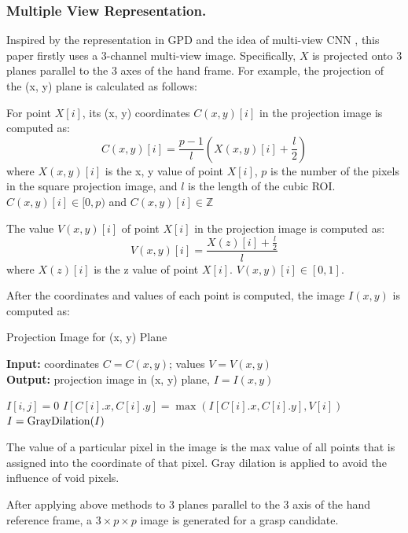 \documentclass[letterpaper]{article} %
\begin{document}
\subsubsection{Multiple View Representation.}
Inspired by the representation in GPD \cite{RN6} and the idea of multi-view CNN \cite{RN7}, this paper firstly uses a 3-channel multi-view image. Specifically, $X$ is projected onto 3 planes parallel to the 3 axes of the hand frame. For example, the projection of the (x, y) plane is calculated as follows:

For point $X[i]$, its (x, y) coordinates $C(x, y)[i]$ in the projection image is computed as:
\begin{equation}
    C(x, y)[i]=\frac{p-1}{l} (X(x, y)[i] + \frac {l} 2)
\end{equation}
where $X(x, y)[i]$ is the x, y value of point $X[i]$, $p$ is the number of the pixels in the square projection image, and $l$ is the length of the cubic ROI. $C(x, y)[i]\in [0, p)$ and $C(x, y)[i]\in \mathbb{Z}$

The value $V(x, y)[i]$ of point $X[i]$ in the projection image is computed as:
\begin{equation}
    V(x, y)[i]=\frac{X(z)[i]+\frac{l}{2}}{l}
\end{equation}
where $X(z)[i]$ is the z value of point $X[i]$. $V(x, y)[i]\in [0, 1]$. 

After the coordinates and values of each point is computed, the image $I(x, y)$ is computed as:

\begin{algorithm}[H]
\caption{Projection Image for (x, y) Plane}
\textbf{Input:} coordinates $C=C(x, y)$; values $V=V(x, y)$\\
\textbf{Output:} projection image in (x, y) plane, $I=I(x,y)$ \\
\begin{algorithmic}[1]
\STATE $I[i, j] = 0$
\ENDFOR
\ENDFOR
{}
\STATE $I[C[i].x, C[i].y]=\max(I[C[i].x, C[i].y], V[i])$
\ENDFOR
\STATE $I={\rm GrayDilation}(I)$
\end{algorithmic}
\end{algorithm}

The value of a particular pixel in the image is the max value of all points that is assigned into the coordinate of that pixel. Gray dilation \cite{BK1} is applied to avoid the influence of void pixels.

After applying above methods to 3 planes parallel to the 3 axis of the hand reference frame, a $3\times p \times p$ image is generated for a grasp candidate.
\end{document}

